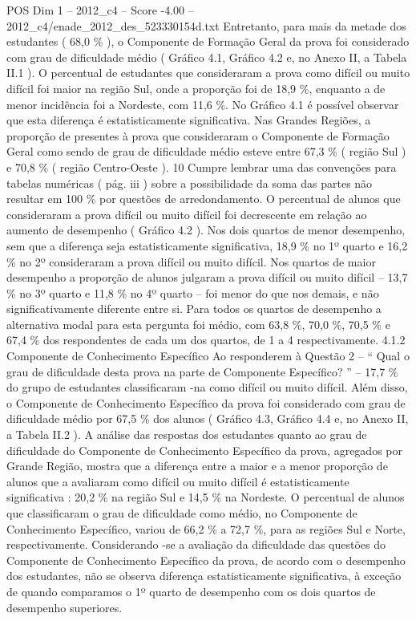 \begin{textsample}{POS Dim 1 – 2012\_c4 – Score -4.00 – 2012\_c4/enade\_2012\_des\_523330154d.txt}
Entretanto, para mais da metade dos estudantes ( 68,0 \% ), o Componente de Formação Geral da prova foi considerado com grau de dificuldade médio ( Gráfico 4.1, Gráfico 4.2 e, no Anexo II, a Tabela II.1 ).
O percentual de estudantes que consideraram a prova como difícil ou muito difícil foi maior na região Sul, onde a proporção foi de 18,9 \%, enquanto a de menor incidência foi a Nordeste, com 11,6 \%.
No Gráfico 4.1 é possível observar que esta diferença é estatisticamente significativa.
Nas Grandes Regiões, a proporção de presentes à prova que consideraram o Componente de Formação Geral como sendo de grau de dificuldade médio esteve entre 67,3 \% ( região Sul ) e 70,8 \% ( região Centro-Oeste ). 10 Cumpre lembrar uma das convenções para tabelas numéricas ( pág. iii ) sobre a possibilidade da soma das partes não resultar em 100 \% por questões de arredondamento.
O percentual de alunos que consideraram a prova difícil ou muito difícil foi decrescente em relação ao aumento de desempenho ( Gráfico 4.2 ).
Nos dois quartos de menor desempenho, sem que a diferença seja estatisticamente significativa, 18,9 \% no 1º quarto e 16,2 \% no 2º consideraram a prova difícil ou muito difícil.
Nos quartos de maior desempenho a proporção de alunos julgaram a prova difícil ou muito difícil – 13,7 \% no 3º quarto e 11,8 \% no 4º quarto – foi menor do que nos demais, e não significativamente diferente entre si.
Para todos os quartos de desempenho a alternativa modal para esta pergunta foi médio, com 63,8 \%, 70,0 \%, 70,5 \% e 67,4 \% dos respondentes de cada um dos quartos, de 1 a 4 respectivamente. 4.1.2 Componente de Conhecimento Específico Ao responderem à Questão 2 – “ Qual o grau de dificuldade desta prova na parte de Componente Específico? ” – 17,7 \% do grupo de estudantes classificaram -na como difícil ou muito difícil.
Além disso, o Componente de Conhecimento Específico da prova foi considerado com grau de dificuldade médio por 67,5 \% dos alunos ( Gráfico 4.3, Gráfico 4.4 e, no Anexo II, a Tabela II.2 ).
A análise das respostas dos estudantes quanto ao grau de dificuldade do Componente de Conhecimento Específico da prova, agregados por Grande Região, mostra que a diferença entre a maior e a menor proporção de alunos que a avaliaram como difícil ou muito difícil é estatisticamente significativa : 20,2 \% na região Sul e 14,5 \% na Nordeste.
O percentual de alunos que classificaram o grau de dificuldade como médio, no Componente de Conhecimento Específico, variou de 66,2 \% a 72,7 \%, para as regiões Sul e Norte, respectivamente.
Considerando -se a avaliação da dificuldade das questões do Componente de Conhecimento Específico da prova, de acordo com o desempenho dos estudantes, não se observa diferença estatisticamente significativa, à exceção de quando comparamos o 1º quarto de desempenho com os dois quartos de desempenho superiores.

\end{textsample}
